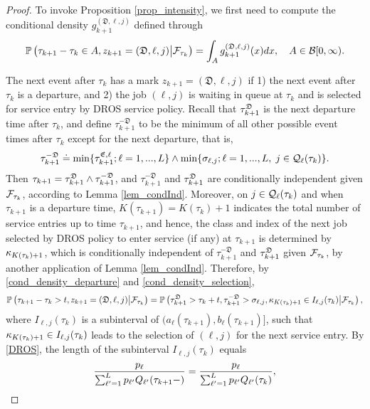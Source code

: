 \documentclass{article}
\theoremstyle{definition}
\numberwithin{equation}{section}
\begin{document}
\begin{proof}
To invoke Proposition \ref{prop_intensity}, we first need to compute the conditional density $g^{(\mathfrak{D},\ell,j)}_{k+1}$ defined through
\begin{equation}\label{prelim_gek_eq2}
\mathbb{P}\left(\tau_{k+1}-\tau_{k}\in A, z_{k+1}=(\mathfrak{D},\ell,j)\big|\mathcal{F}_{\tau_k}\right)= \int_A g^{(\mathfrak{D},\ell,j)}_{k+1}(x) dx,\quad  A\in\mathcal{B}[0,\infty).
\end{equation}


The next event after $\tau_k$ has a mark $z_{k+1}=(\mathfrak{D},\ell,j)$ if 1) the next event after $\tau_k$ is a departure, and 2) the job $(\ell,j)$ is waiting in queue at $\tau_k$ and is selected for service entry by DROS service policy. Recall that $\tau^{\mathfrak{D}}_{k+1}$ is the next departure time after $\tau_k$, and define $\tau_{k+1}^{-\mathfrak{D}}$  to be the minimum of all other possible event times after $\tau_k$ except for the next departure, that is,
\[
  \tau_{k+1}^{-\mathfrak{D}} \doteq \min\{\tau^{\mathfrak{E},\ell}_{k+1};\ell=1,...,L\} \wedge \min\{\sigma_{\ell,j}; \ell=1,...,L,\;j\in\mathcal{Q}_{\ell}(\tau_k)\}.
\]
Then $\tau_{k+1}= \tau^{\mathfrak{D}}_{k+1}\wedge\tau_{k+1}^{-\mathfrak{D}}$, and $\tau_{k+1}^{-\mathfrak{D}}$ and $\tau^{\mathfrak{D}}_{k+1}$ are conditionally independent given $\mathcal{F}_{\tau_k}$, according to Lemma \ref{lem_condInd}. Moreover, on $j\in\mathcal{Q}_{\ell}(\tau_k)$ and when $\tau_{k+1}$ is a departure time, $K(\tau_{k+1})=K(\tau_k)+1$ indicates the total number of service entries up to time $\tau_{k+1}$, and hence, the class and index of the next job selected by DROS policy to enter service (if any) at $\tau_{k+1}$  is determined by $\kappa_{K(\tau_{k})+1}$, which is conditionally independent of $\tau_{k+1}^{-\mathfrak{D}}$ and $\tau^{\mathfrak{D}}_{k+1}$  given $\mathcal{F}_{\tau_k}$, by another application of Lemma \ref{lem_condInd}. Therefore, by \eqref{cond_density_departure} and \eqref{cond_density_selection},
\[
\mathbb{P}\left(\tau_{k+1}-\tau_{k}>t, z_{k+1}=(\mathfrak{D},\ell,j)\big|\mathcal{F}_{\tau_k}\right) = \mathbb{P}\left(\tau^{\mathfrak{D}}_{k+1}>\tau_k+t,\tau_{k+1}^{-\mathfrak{D}}>\sigma_{\ell,j} , \kappa_{K(\tau_k)+1}\in I_{\ell,j}(\tau_k) \big|\mathcal{F}_{\tau_k}\right),
\]
where $I_{\ell,j}(\tau_k)$ is a subinterval of $(a_\ell(\tau_{k+1}),b_\ell(\tau_{k+1})]$, such that $\kappa_{K(\tau_k)+1}\in I_{\ell,j}(\tau_k)$ leads to the selection of $(\ell,j)$ for the next service entry. By \eqref{DROS}, the length of the subinterval $I_{\ell,j}(\tau_k)$ equals
\[
\frac{p_\ell}{\sum_{\ell'=1}^{L}p_{\ell'}Q_{\ell'}(\tau_{k+1}-)} =\frac{p_\ell}{\sum_{\ell'=1}^{L}p_{\ell'}Q_{\ell'}(\tau_k)},
\]
\end{proof}
\end{document}
